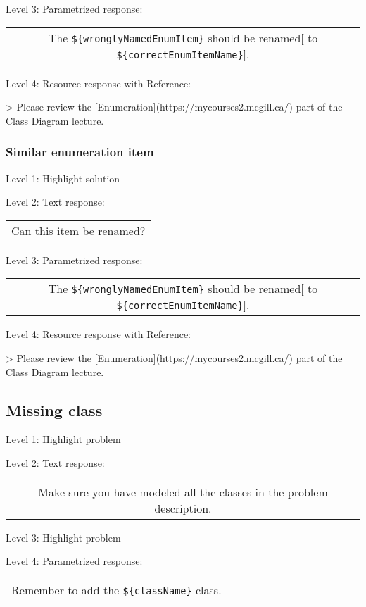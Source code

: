 \noindent Level 3: Parametrized response: \medskip

\begin{tabular}{|c}
The \verb|${wronglyNamedEnumItem}| should be renamed[ to \verb|${correctEnumItemName}|].
\end{tabular} \medskip

\noindent Level 4: Resource response with Reference:

> Please review the [Enumeration](https://mycourses2.mcgill.ca/) part of the Class Diagram lecture.


\subsubsection{Similar enumeration item}

\noindent Level 1: Highlight solution \medskip

\noindent Level 2: Text response: \medskip

\begin{tabular}{|c}
Can this item be renamed?
\end{tabular} \medskip

\noindent Level 3: Parametrized response: \medskip

\begin{tabular}{|c}
The \verb|${wronglyNamedEnumItem}| should be renamed[ to \verb|${correctEnumItemName}|].
\end{tabular} \medskip

\noindent Level 4: Resource response with Reference:

> Please review the [Enumeration](https://mycourses2.mcgill.ca/) part of the Class Diagram lecture.


\subsection{Missing class}

\noindent Level 1: Highlight problem \medskip

\noindent Level 2: Text response: \medskip

\begin{tabular}{|c}
Make sure you have modeled all the classes in the problem description.
\end{tabular} \medskip

\noindent Level 3: Highlight problem \medskip

\noindent Level 4: Parametrized response: \medskip

\begin{tabular}{|c}
Remember to add the \verb|${className}| class.
\end{tabular} \medskip


